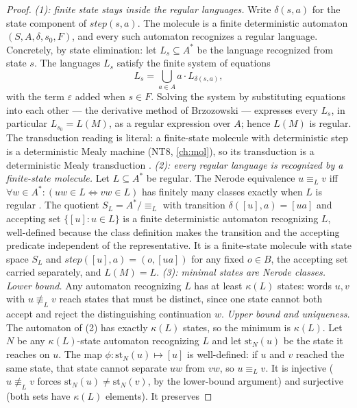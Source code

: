 \begin{proof}
\emph{(1): finite state stays inside the regular languages.} Write
$\delta(s, a)$ for the state component of $\mathit{step}(s, a)$. The molecule
is a finite deterministic automaton $(S, A, \delta, s_0, F)$, and every such
automaton recognizes a regular language. Concretely, by state elimination:
let $L_s \subseteq A^{*}$ be the language recognized from state $s$. The
languages $L_s$ satisfy the finite system of equations
\[
L_s = \bigcup_{a \in A} a \cdot L_{\delta(s,a)},
\]
with the term $\varepsilon$ added when $s \in F$. Solving the system by
substituting equations into each other --- the derivative method of Brzozowski
\cite{brzozowski} --- expresses every $L_s$, in particular $L_{s_0} = L(M)$,
as a regular expression over $A$; hence $L(M)$ is regular. The transduction
reading is literal: a finite-state molecule with deterministic step is a
deterministic Mealy machine (NT8, \autoref{ch:mol}), so its transduction is a
deterministic Mealy transduction \cite{mealy}.
\emph{(2): every regular language is recognized by a finite-state molecule.}
Let $L \subseteq A^{*}$ be regular. The Nerode equivalence $u \equiv_L v$ iff
$\forall w \in A^{*} \colon (uw \in L \Leftrightarrow vw \in L)$ has finitely
many classes exactly when $L$ is regular \cite{nerode}. The quotient
$S_L = A^{*} / \equiv_L$ with transition $\delta([u], a) = [ua]$ and accepting
set $\{[u] : u \in L\}$ is a finite deterministic automaton recognizing $L$,
well-defined because the class definition makes the transition and the
accepting predicate independent of the representative. It is a finite-state
molecule with state space $S_L$ and $\mathit{step}([u], a) = (o, [ua])$ for
any fixed $o \in B$, the accepting set carried separately, and $L(M) = L$.
\emph{(3): minimal states are Nerode classes.} \emph{Lower bound.} Any
automaton recognizing $L$ has at least $\kappa(L)$ states: words $u, v$ with
$u \not\equiv_L v$ reach states that must be distinct, since one state cannot
both accept and reject the distinguishing continuation $w$.
\emph{Upper bound and uniqueness.} The automaton of (2) has exactly
$\kappa(L)$ states, so the minimum is $\kappa(L)$. Let $N$ be any
$\kappa(L)$-state automaton recognizing $L$ and let $\mathrm{st}_N(u)$ be the
state it reaches on $u$. The map $\phi \colon \mathrm{st}_N(u) \mapsto [u]$ is
well-defined: if $u$ and $v$ reached the same state, that state cannot
separate $uw$ from $vw$, so $u \equiv_L v$. It is injective ($u \not\equiv_L
v$ forces $\mathrm{st}_N(u) \neq \mathrm{st}_N(v)$, by the lower-bound
argument) and surjective (both sets have $\kappa(L)$ elements). It preserves

\end{proof}
